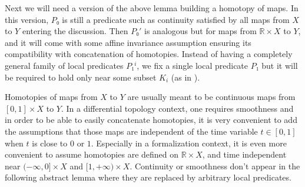 \documentclass[10pt,a4paper]{article}
\begin{document}
Next we will need a version of the above lemma building a homotopy of maps.
In this version, $P₀$ is still a predicate such as continuity satisfied by
all maps from $X$ to $Y$ entering the discussion. Then $P₀'$ is analogous but for
maps from $ℝ × X$ to $Y$, and it will come with some affine invariance assumption
ensuring its compatibility with concatenation of homotopies.
Instead of having a completely general family of local predicates
$P₁^i$, we fix a single local predicate $P₁$ but it will be required to hold only
near some subset $K_i$ (as in ).

Homotopies of maps from $X$ to $Y$ are usually meant to be continuous maps from
$[0, 1] × X$ to $Y$. In a differential topology context, one requires
smoothness and in order to be able to easily concatenate homotopies, it is very
convenient to add the assumptions that those maps are independent of the time
variable $t ∈ [0, 1]$ when $t$ is close to $0$ or $1$. Especially in a
formalization context, it is even more convenient to assume homotopies are defined on
$ℝ × X$, and time independent near $(-∞, 0] × X$ and $[1, +∞) × X$. Continuity or
smoothness don't appear in the following abstract lemma where they are replaced by
arbitrary local predicates.
\end{document}
